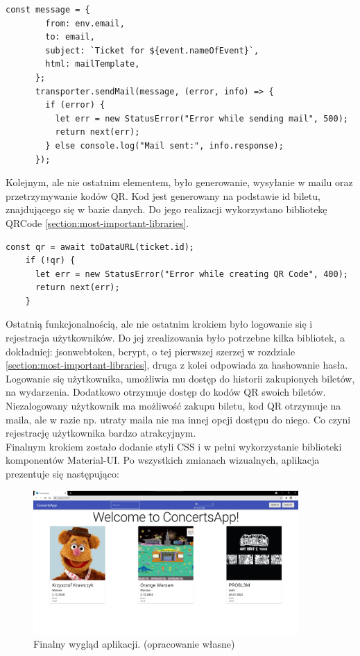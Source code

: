 \documentclass[12pt]{article}
\begin{document}
\begin{sloppypar}
{\begin{lstlisting}[caption=Kod odpowiadający za wysyłanie emaili., captionpos=b]
      const message = {
        from: env.email,
        to: email,
        subject: `Ticket for ${event.nameOfEvent}`,
        html: mailTemplate,
      };
      transporter.sendMail(message, (error, info) => {
        if (error) {
          let err = new StatusError("Error while sending mail", 500);
          return next(err);
        } else console.log("Mail sent:", info.response);
      });
  \end{lstlisting}
  Kolejnym, ale nie ostatnim elementem, było generowanie, wysyłanie w mailu oraz przetrzymywanie kodów QR. 
  Kod jest generowany na podstawie id biletu, znajdującego się w bazie danych. 
  Do jego realizacji wykorzystano bibliotekę QRCode \ref{section:most-important-libraries}.
  \begin{lstlisting}[caption=Kod odpowiadający za generowanie kodów QR., captionpos=b]
    const qr = await toDataURL(ticket.id);
    if (!qr) {
      let err = new StatusError("Error while creating QR Code", 400);
      return next(err);
    }
  \end{lstlisting}
  Ostatnią funkcjonalnością, ale nie ostatnim krokiem było logowanie się i rejestracja użytkowników. 
  Do jej zrealizowania było potrzebne kilka bibliotek, a dokładniej: jsonwebtoken, bcrypt, o tej pierwszej szerzej w rozdziale \ref{section:most-important-libraries}, 
  druga z kolei odpowiada za hashowanie hasła.
  Logowanie się użytkownika, umożliwia mu dostęp do historii zakupionych biletów, na wydarzenia. Dodatkowo otrzymuje dostęp do kodów QR swoich biletów. 
  Niezalogowany użytkownik ma możliwość zakupu biletu, kod QR otrzymuje na maila, ale w razie np. utraty maila nie ma innej opcji dostępu do niego. 
  Co czyni rejestrację użytkownika bardzo atrakcyjnym.\\
  Finalnym krokiem zostało dodanie styli CSS i w pełni wykorzystanie biblioteki komponentów Material-UI. 
  Po wszystkich zmianach wizualnych, aplikacja prezentuje się następująco:
  \begin{figure}[H]
    \centering
    \includegraphics[width=0.9\textwidth]{client_app/home.png}
    \caption{Finalny wygląd aplikacji. (opracowanie własne)}
    \label{fig:final-view}
  \end{figure}
}


\end{sloppypar}
\end{document}
